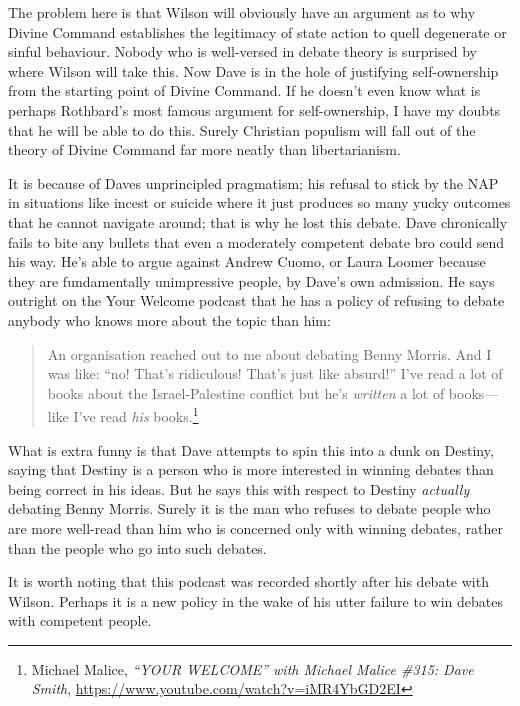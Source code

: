 \documentclass[11pt]{article}
\begin{document}
The problem here is that Wilson will obviously have an argument as to why Divine Command establishes the legitimacy of state action to quell degenerate or sinful behaviour. Nobody who is well-versed in debate theory is surprised by where Wilson will take this. Now Dave is in the hole of justifying self-ownership from the starting point of Divine Command. If he doesn't even know what is perhaps Rothbard's most famous argument for self-ownership, I have my doubts that he will be able to do this. Surely Christian populism will fall out of the theory of Divine Command far more neatly than libertarianism.

It is because of Daves unprincipled pragmatism; his refusal to stick by the NAP in situations like incest or suicide where it just produces so many yucky outcomes that he cannot navigate around; that is why he lost this debate. Dave chronically fails to bite any bullets that even a moderately competent debate bro could send his way. He's able to argue against Andrew Cuomo, or Laura Loomer because they are fundamentally unimpressive people, by Dave's own admission. He says outright on the Your Welcome podcast that he has a policy of refusing to debate anybody who knows more about the topic than him:
\begin{quote}
An organisation reached out to me about debating Benny Morris. And I was like: ``no! That's ridiculous! That's just like absurd!'' I've read a lot of books about the Israel-Palestine conflict but he's \emph{written} a lot of books---like I've read \emph{his} books.\footnote{Michael Malice, \emph{``YOUR WELCOME'' with Michael Malice \#315: Dave Smith}, \url{https://www.youtube.com/watch?v=iMR4YbGD2EI}}
\end{quote}

What is extra funny is that Dave attempts to spin this into a dunk on Destiny, saying that Destiny is a person who is more interested in winning debates than being correct in his ideas. But he says this with respect to Destiny \emph{actually} debating Benny Morris. Surely it is the man who refuses to debate people who are more well-read than him who is concerned only with winning debates, rather than the people who go into such debates.

It is worth noting that this podcast was recorded shortly after his debate with Wilson. Perhaps it is a new policy in the wake of his utter failure to win debates with competent people.
\end{document}
